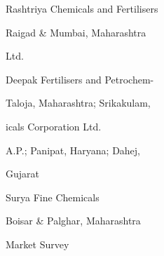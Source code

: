 \documentclass[a4paper,portrait,12pt]{article}
\begin{document}
\begin{flushleft}
Rashtriya Chemicals and Fertilisers
\end{flushleft}





\begin{flushleft}
Raigad \& Mumbai, Maharashtra
\end{flushleft}





\begin{flushleft}
Ltd.
\end{flushleft}


\begin{flushleft}
Deepak Fertilisers and Petrochem-
\end{flushleft}





\begin{flushleft}
Taloja, Maharashtra; Srikakulam,
\end{flushleft}





\begin{flushleft}
icals Corporation Ltd.
\end{flushleft}





\begin{flushleft}
A.P.; Panipat, Haryana; Dahej,
\end{flushleft}


\begin{flushleft}
Gujarat
\end{flushleft}





\begin{flushleft}
Surya Fine Chemicals
\end{flushleft}





\begin{flushleft}
Boisar \& Palghar, Maharashtra
\end{flushleft}





\begin{flushleft}
\newpage
Market Survey
\end{flushleft}
\end{document}
